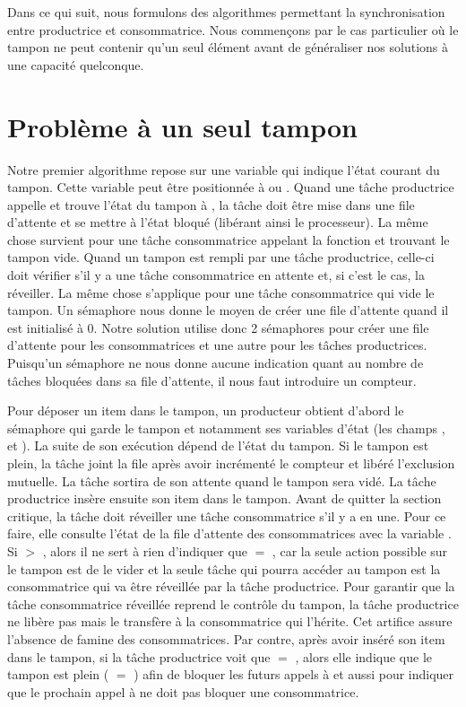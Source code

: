 Dans ce qui suit, nous formulons des algorithmes permettant la synchronisation entre productrice et consommatrice. Nous commençons par le cas particulier où le tampon ne peut contenir qu'un seul élément avant de généraliser nos solutions à une capacité quelconque.

\section{Problème à un seul tampon}
Notre premier algorithme repose sur une variable qui indique l'état courant du tampon. Cette variable peut être positionnée à  ou .
Quand une tâche productrice appelle  et trouve l'état du tampon à , la tâche doit être mise dans une file d'attente et se mettre à l'état bloqué (libérant ainsi le processeur). La même chose survient pour une tâche consommatrice appelant la fonction  et trouvant le tampon vide. Quand un tampon est rempli par une tâche productrice, celle-ci doit vérifier s'il y a une tâche consommatrice en attente et, si c'est le cas, la réveiller. La même chose s'applique pour une tâche consommatrice qui vide le tampon.
Un sémaphore nous donne le moyen de créer une file d'attente quand il est initialisé à 0. Notre solution utilise donc 2 sémaphores pour créer une file d'attente pour les consommatrices et une autre pour les tâches productrices. Puisqu'un sémaphore ne nous donne aucune indication quant au nombre de tâches bloquées dans sa file d'attente, il nous faut introduire un compteur.

Pour déposer un item dans le tampon, un producteur obtient d'abord le sémaphore  qui garde le tampon et notamment ses variables d'état (les champs ,  et ).
La suite de son exécution dépend de l'état du tampon. Si le tampon est plein, la tâche joint la file  après avoir incrémenté le compteur  et libéré l'exclusion mutuelle. La tâche sortira de son attente quand le tampon sera vidé.
La tâche productrice insère ensuite son item dans le tampon. Avant de quitter la section critique, la tâche doit réveiller une tâche consommatrice s'il y a en une. Pour ce faire, elle consulte l'état de la file d'attente des consommatrices avec la variable . Si  $>$ , alors il ne sert à rien d'indiquer que  $=$ , car la seule action possible sur le tampon est de le vider et la seule tâche qui pourra accéder au tampon est la consommatrice qui va être réveillée par la tâche productrice. Pour garantir que la tâche consommatrice réveillée reprend le contrôle du tampon, la tâche productrice ne libère pas  mais le transfère à la consommatrice qui l'hérite. Cet artifice assure l'absence de famine des consommatrices.
Par contre, après avoir inséré son item dans le tampon, si la tâche productrice voit que  $=$ , alors elle indique que le tampon est plein ( $=$ ) afin de bloquer les futurs appels à  et aussi pour indiquer que le prochain appel à  ne doit pas bloquer une consommatrice.

